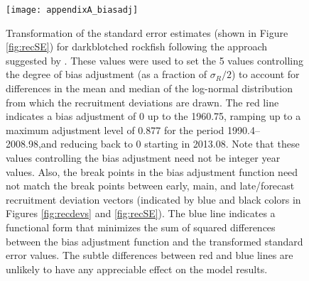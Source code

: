 \begin{figure}[H]
	\begin{center}
		\texttt{[image: appendixA\_biasadj]}\\
	\end{center}
	\caption{Transformation of the standard error estimates (shown in Figure \ref{fig:recSE}) for darkblotched rockfish following the approach suggested by \citet{methot-adjusting-2011}. These values were used to set the 5 values controlling the degree of bias adjustment (as a fraction of  $\sigma_R/2$) to account for differences in the mean and median of the log-normal distribution from which the recruitment deviations are drawn. The red line indicates a bias adjustment of 0 up to the  1960.75, ramping up to a maximum adjustment level of 0.877 for the period 1990.4--2008.98,and reducing back to 0 starting in 2013.08. Note that these values controlling the bias adjustment need not be integer year values. Also, the break points in the bias adjustment function need not match the break points between early, main, and late/forecast recruitment deviation vectors (indicated by blue and black colors in Figures \ref{fig:recdevs} and \ref{fig:recSE}). The blue line indicates a functional form that minimizes the sum of squared differences between the bias adjustment function and the transformed standard error values. The subtle differences between red and blue lines are unlikely to have any appreciable effect on the model results.}
	\label{fig:ramp}
\end{figure}


